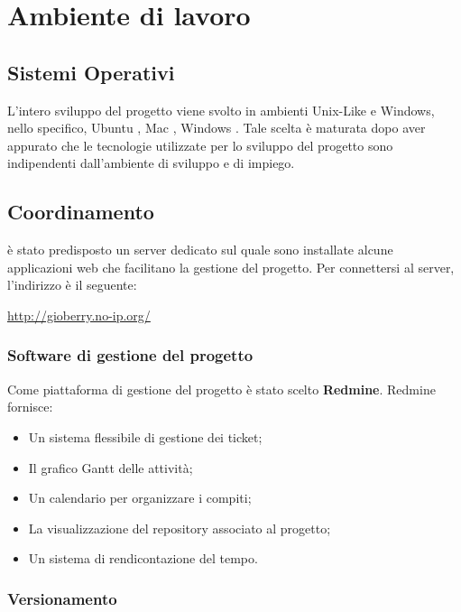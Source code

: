 \section{Ambiente di lavoro} 

\subsection{Sistemi Operativi}

L’intero sviluppo del progetto viene svolto in ambienti Unix-Like e Windows, nello specifico, Ubuntu , Mac , Windows . Tale scelta \`{e} maturata dopo aver appurato che le tecnologie utilizzate per lo sviluppo del progetto sono indipendenti dall’ambiente di sviluppo e di impiego.

\subsection{Coordinamento}

\`{e} stato predisposto un server dedicato sul quale sono installate alcune applicazioni web
che facilitano la gestione del progetto. Per connettersi al server, l'indirizzo \`{e} il seguente:\\
\begin{center}
\url{http://gioberry.no-ip.org/}
\end{center}
\subsubsection{Software di gestione del progetto} 
\label{subsec:Software di gestione del prodotto}
Come piattaforma di gestione del progetto \`{e} stato scelto \textbf{Redmine}. Redmine fornisce:
\begin{itemize}
\item Un sistema flessibile di gestione dei ticket;
\item Il grafico Gantt delle attivit\`{a};
\item Un calendario per organizzare i compiti;
\item La visualizzazione del repository associato al progetto;
\item Un sistema di rendicontazione del tempo.
\end{itemize}


\subsubsection{Versionamento}


